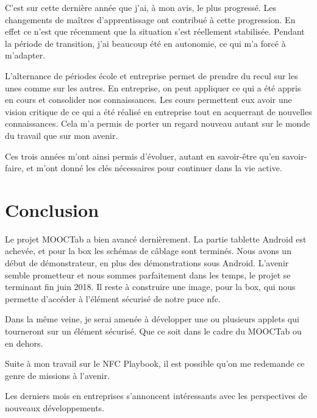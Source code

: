 \documentclass[french,12pt,a4paper,titlepage,openright,openbib]{report}
\begin{document}
C'est sur cette dernière année que j'ai, à mon avis, le plus progressé.
Les changements de maîtres d'apprentissage ont contribué à cette progression. En effet ce n'est que récemment que la situation s'est réellement stabilisée. Pendant la période de transition, j'ai beaucoup été en autonomie, ce qui m'a forcé à m'adapter.

L'alternance de périodes école et entreprise permet de prendre du recul sur les unes comme sur les autres. En entreprise, on peut appliquer ce qui a été appris en cours et consolider nos connaissances. Les cours permettent eux avoir une vision critique de ce qui a été réalisé en entreprise tout en acquerrant de nouvelles connaissances. Cela m'a permis de porter un regard nouveau autant sur le monde du travail que sur mon avenir.

Ces trois années m'ont ainsi permis d'évoluer, autant en savoir-être qu'en savoir-faire, et m'ont donné les clés nécessaires pour continuer dans la vie active.

\chapter{Conclusion}
Le projet MOOCTab a bien avancé dernièrement.
La partie tablette Android est achevée, et pour la box les schémas de câblage sont terminés. Nous avons un début de démonstrateur, en plus des démonstrations sous Android.
L'avenir semble prometteur et nous sommes parfaitement dans les temps, le projet se terminant fin juin 2018.
Il reste à construire une image, pour la box, qui nous permette d'accéder à l'élément sécurisé de notre puce \gls{nfc}.

Dans la même veine, je serai amenée à développer une ou plusieurs applets qui tourneront sur un élément sécurisé. Que ce soit dans le cadre du MOOCTab ou en dehors.

Suite à mon travail sur le NFC Playbook, il est possible qu'on me redemande ce genre de missions à l'avenir.

Les derniers mois en entreprises s'annoncent intéressants avec les perspectives de nouveaux développements.

\printglossary[title={Glossaire}]

{}

	
\end{document}
